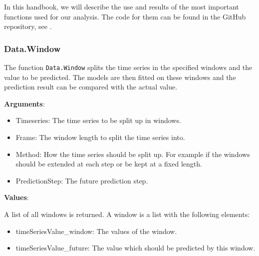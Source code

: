 In this handbook, we will describe the use and results of the most important functions used for our analysis.  The code for them can be found in the GitHub repository, see \textcite{GitHub}. 

\subsubsection{Data.Window}
\label{sec: Data.Window}

The function \texttt{Data.Window} splits the time series in the specified windows and the value to be predicted. The models are then fitted on these windows and the prediction result can be compared with the actual value.

\textbf{Arguments}:

\begin{itemize}
	\item Timeseries: The time series to be split up in windows.
	\item Frame: The window length to split the time series into.
	\item Method: How the time series should be split up. For example if the windows should be extended at each step or be kept at a fixed length.
	\item PredictionStep: The future prediction step.
\end{itemize}

\textbf{Values}:

A list of all windows is returned. A window is a list with the following elements: 

\begin{itemize}
	\item timeSeriesValue\_window: The values of the window.
	\item timeSeriesValue\_future: The value which should be predicted by this window. 
\end{itemize}

